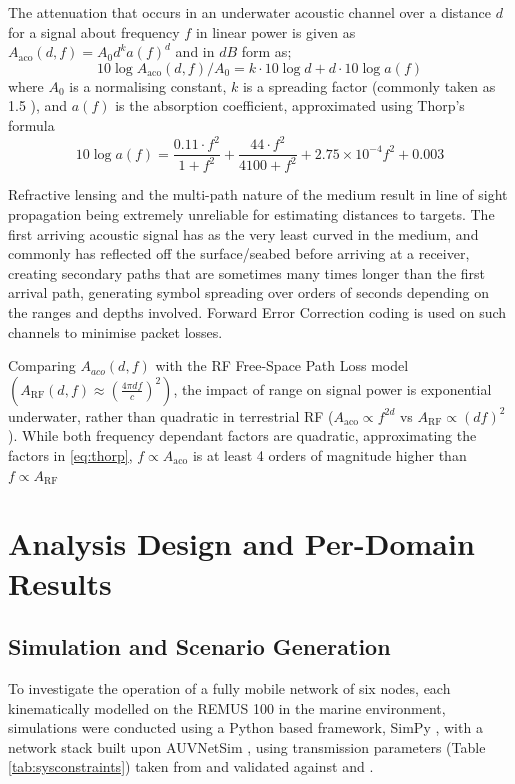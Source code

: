 The attenuation that occurs in an underwater acoustic channel over a distance $d$ for a signal about frequency $f$ in linear power is given as $A_{\text{aco}}(d,f) = A_0d^ka(f)^d$ and in $dB$ form as;
%
\begin{equation}
\label{eq:acoattenuationdb}
10 \log A_{\text{aco}}(d,f)/A_0 = k \cdot 10 \log d + d \cdot 10 \log a(f)
\end{equation}
%
where $A_0$ is a normalising constant, $k$ is a spreading factor (commonly taken as 1.5  \cite{Stojanovic2007}), and $a(f)$ is the absorption coefficient, approximated using Thorp's formula \cite{Stefanov2011}
%
\begin{equation}
\label{eq:thorp}
10 \log a(f) = \frac{0.11 \cdot f^2}{1+f^2} + \frac{44\cdot f^2}{4100+f^2}+ 2.75\times10^{-4} f^2 + 0.003
\end{equation}
%

Refractive lensing and the multi-path nature of the medium result in line of sight propagation being extremely unreliable for estimating distances to targets.
The first arriving acoustic signal has as the very least curved in the medium, and commonly has reflected off the surface/seabed before arriving at a receiver, creating secondary paths that are sometimes many times longer than the first arrival path, generating symbol spreading over orders of seconds depending on the ranges and depths involved.
Forward Error Correction coding is used on such channels to minimise packet losses.

Comparing $A_{aco}(d,f)$ with the RF Free-Space Path Loss model $(A_{\text{RF}}(d,f) \approx \left( \frac{4\pi d f}{c} \right)^2)$, the impact of range on signal power is exponential underwater, rather than quadratic in terrestrial RF ($A_{\text{aco}} \propto f^{2d}$ vs $A_{\text{RF}} \propto (df)^2$). 
While both frequency dependant factors are quadratic, approximating the factors in \eqref{eq:thorp}, $f\propto A_{\text{aco}}$ is at least 4 orders of magnitude higher than $f\propto A_{\text{RF}}$

\section{Analysis Design and Per-Domain Results}


\subsection{Simulation and Scenario Generation}
To investigate the operation of a fully mobile network of six nodes, each kinematically modelled on the REMUS 100 \cite{Milgram2001} in the marine environment, simulations were conducted using a Python based framework, SimPy \cite{Mueller2003SimPy}, with a network stack built upon AUVNetSim \cite{Miquel2008}, using transmission parameters (Table \ref{tab:sysconstraints}) taken from and validated against \cite{Stojanovic2007} and \cite{Stefanov2011}.

